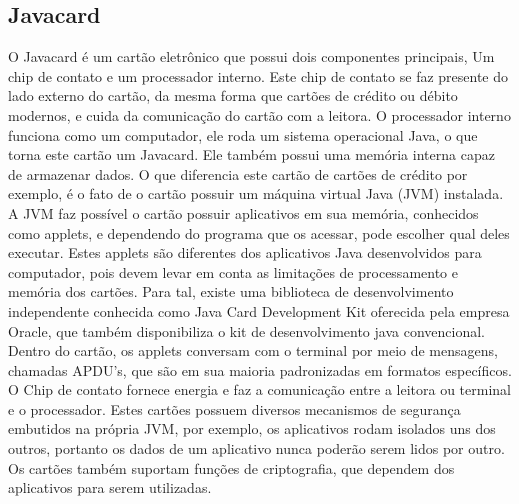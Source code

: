 \documentclass{article}
\begin{document}
	\subsection{Javacard}
		\begin{justify}
			

				\hspace{2cm} O Javacard é um cartão eletrônico que possui dois componentes principais, Um chip de contato e um processador interno. Este chip de contato se faz presente do lado externo do cartão, da mesma forma que cartões de crédito ou débito modernos, e cuida da comunicação do cartão com a leitora. O processador interno funciona como um computador, ele roda um sistema operacional Java, o que torna este cartão um Javacard. Ele também possui uma memória interna capaz de armazenar dados. O que diferencia este cartão de cartões de crédito por exemplo, é o fato de o cartão possuir um máquina virtual Java (JVM) instalada. A JVM faz possível o cartão possuir aplicativos em sua memória, conhecidos como applets, e dependendo do programa que os acessar, pode escolher qual deles executar. Estes applets são diferentes dos aplicativos Java desenvolvidos para computador, pois devem levar em conta as limitações de processamento e memória dos cartões. Para tal, existe uma biblioteca de desenvolvimento independente conhecida como Java Card Development Kit oferecida pela empresa Oracle, que também disponibiliza o kit de desenvolvimento java convencional. Dentro do cartão, os applets conversam com o terminal por meio de mensagens, chamadas APDU's, que são em sua maioria padronizadas em formatos específicos. O Chip de contato fornece energia e faz a comunicação entre a leitora ou terminal e o processador. Estes cartões possuem diversos mecanismos de segurança embutidos na própria JVM, por exemplo, os aplicativos rodam isolados uns dos outros, portanto os dados de um aplicativo nunca poderão serem lidos por outro. Os cartões também suportam funções de criptografia, que dependem dos aplicativos para serem utilizadas.

			
		\end{justify}
\end{document}
